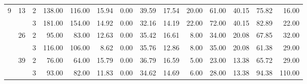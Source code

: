 \begin{tabular}{lllrrrrrrrrrrr}
\multirow{6}{*}{9} & \multirow{2}{*}{13} & 2 &   138.00 &    116.00 & 15.94 &    0.00 &   39.59 &   17.54 &   20.00 &   61.00 &   40.15 &  75.82 &    16.00 \\
  &    & 3 &   181.00 &    154.00 & 14.92 &    0.00 &   32.16 &   14.19 &   22.00 &   72.00 &   40.15 &  82.89 &    22.00 \\
\cline{2-14}
  & \multirow{2}{*}{26} & 2 &    95.00 &     83.00 & 12.63 &    0.00 &   35.42 &   16.61 &    8.00 &   34.00 &   20.08 &  67.85 &    32.00 \\
  &    & 3 &   116.00 &    106.00 &  8.62 &    0.00 &   35.76 &   12.86 &    8.00 &   35.00 &   20.08 &  61.38 &    29.00 \\
\cline{2-14}
  & \multirow{2}{*}{39} & 2 &    76.00 &     64.00 & 15.79 &    0.00 &   36.79 &   16.59 &    5.00 &   23.00 &   13.38 &  65.72 &    29.00 \\
  &    & 3 &    93.00 &     82.00 & 11.83 &    0.00 &   34.62 &   14.69 &    6.00 &   28.00 &   13.38 &  94.38 &   110.00 \\
\bottomrule
\end{tabular}

